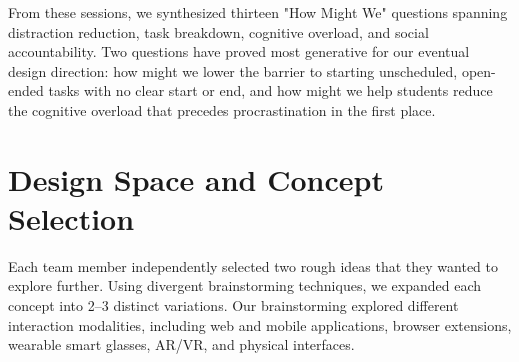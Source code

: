 \documentclass[sigplan,screen]{acmart}
\begin{document}
From these sessions, we synthesized thirteen "How Might We" questions spanning distraction reduction, task breakdown, cognitive overload, and social accountability. Two questions have proved most generative for our eventual design direction: how might we lower the barrier to starting unscheduled, open-ended tasks with no clear start or end, and how might we help students reduce the cognitive overload that precedes procrastination in the first place.

\section{Design Space and Concept Selection}
Each team member independently selected two rough ideas that they wanted to explore further. Using divergent brainstorming techniques, we expanded each concept into 2--3 distinct variations. Our brainstorming explored different interaction modalities, including web and mobile applications, browser extensions, wearable smart glasses, AR/VR, and physical interfaces.
\end{document}
